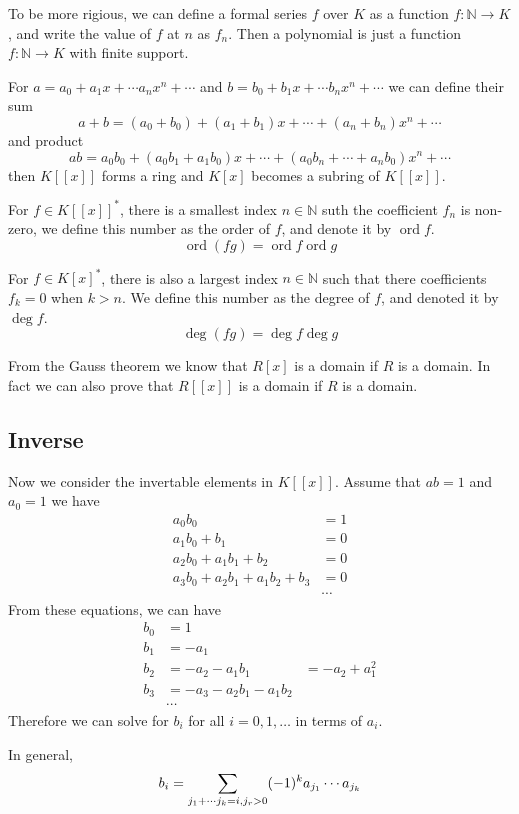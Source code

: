 \documentclass{article}
\def\ord{\mathop{\mathrm ord}}
\def\deg{\mathop{\mathrm deg}}
\begin{document}
To be more rigious, we can define a formal series $f$ over $K$ as a function $f : \mathbb N \to K$,
and write the value of $f$ at $n$ as $f_n$.
Then a polynomial is just a function $f : \mathbb N \to K$ with finite support.

For $a = a_0 + a_1 x + \cdots a_nx^n + \cdots$ and $b = b_0 + b_1 x + \cdots b_n x^n + \cdots$
we can define their sum
$$a + b = (a_0 + b_0) + (a_1 + b_1) x + \cdots + (a_n + b_n) x^n + \cdots$$
and product
$$ab = a_0 b_0 + (a_0 b_1 + a_1 b_0) x + \cdots + (a_0b_n + \cdots + a_nb_0) x^n + \cdots$$
then $K[[x]]$ forms a ring and $K[x]$ becomes a subring of $K[[x]]$.

For $f \in K[[x]]^\ast$, there is a smallest index $n \in \mathbb N$ suth the coefficient 
$f_n$ is non-zero, we define this number as the order of $f$, and denote it by $\ord f$. 
$$\ord(fg) = \ord f \ord g$$

For $f \in K[x]^\ast$, there is also a largest index $n \in \mathbb N$ such that there coefficients
$f_k = 0$ when $k > n$. We define this number as the degree of $f$, and denoted it by $\deg f$.
$$\deg(fg) = \deg f \deg g$$

From the Gauss theorem we know that $R[x]$ is a domain if $R$ is a domain.
In fact we can also prove that $R[[x]]$ is a domain if $R$ is a domain.

\subsection{Inverse}
Now we consider the invertable elements in $K[[x]]$.
Assume that $ab = 1$ and $a_0 = 1$
we have
\begin{align*}
a_0 b_0 &= 1 \\
a_1 b_0 + b_1 &= 0 \\
a_2 b_0 + a_1b_1 + b_2 &= 0 \\
a_3 b_0 + a_2b_1 + a_1b_2 + b_3 &= 0 \\
& \cdots
\end{align*}
From these equations, we can have
\begin{align*}
b_0 &= 1 \\
b_1 &= -a_1 \\
b_2 &= -a_2 - a_1b_1 &= -a_2 + a_1^2 \\
b_3 &= -a_3 - a_2b_1 - a_1b_2 \\
& \cdots
\end{align*}
Therefore we can solve for $b_i$ for all $i = 0, 1, \dots$ in terms of $a_i$.

In general,
$$b_i = \sum_{j_1 + \cdots j_k = i,\\ j_r > 0} (-1)^k a_{j_1} \cdots a_{j_k}$$
\end{document}

